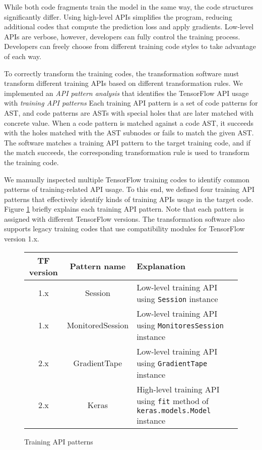 While both code fragments train the model in the same way, 
the code structures significantly differ.
Using high-level APIs simplifies the program,
reducing additional codes that compute the prediction loss and apply gradients.
Low-level APIs are verbose, however, developers can fully control
the training process.
Developers can freely choose from different training code styles to
take advantage of each way.

To correctly transform the training codes, 
the transformation software must transform different training APIs
based on different transformation rules. 
We implemented an \textit{API pattern analysis} that identifies
the TensorFlow API usage with \textit{training API patterns} 
Each training API pattern is a set of code patterns for AST,
and code patterns are ASTs with
special holes that are later matched with concrete value.
When a code pattern is matched against a code AST,
it succeeds with the holes matched with the AST subnodes
or fails to match the given AST.
The software matches a training API pattern to the target training code,
and if the match succeeds, the corresponding transformation rule
is used to transform the training code.

We manually inspected multiple TensorFlow training codes to identify
common patterns of training-related API usage. 
To this end, we defined four training API patterns
that effectively identify kinds of training APIs usage in the target code.
Figure \ref{tab:patterns} briefly explains each training API pattern.
Note that each pattern is assigned with different TensorFlow versions.
The transformation software also supports legacy training codes
that use compatibility modules for TensorFlow version 1.x.

\begin{figure}
  \centering
  \begin{tabular}{|c|c|l|}
    \hline
    TF version & Pattern name & Explanation \\
    \hline
    1.x & Session & Low-level training API using {\tt Session} instance\\
    \hline
    1.x & MonitoredSession & Low-level training API using {\tt MonitoresSession} instance \\
    \hline
    2.x & GradientTape & Low-level training API using {\tt GradientTape} instance\\
    \hline
    2.x & Keras & High-level training API using {\tt fit} method of {\tt keras.models.Model} instance\\
    \hline
  \end{tabular}
  \caption{Training API patterns}
  \label{tab:patterns}
\end{figure}

